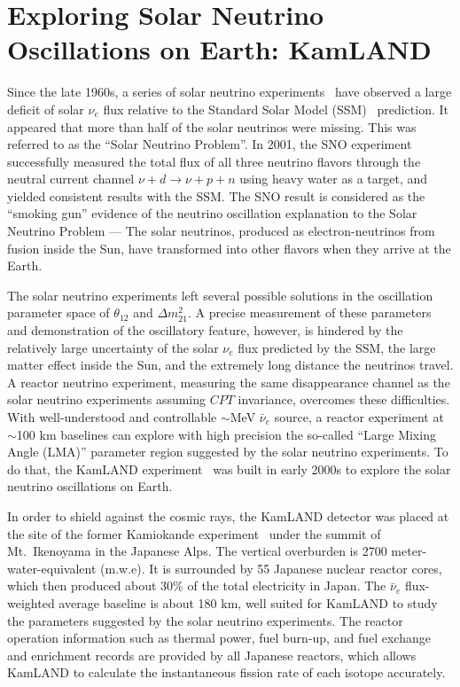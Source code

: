 \section{Exploring Solar Neutrino Oscillations on Earth: KamLAND} 
\label{sec:kamland}

Since the late 1960s, a series of solar neutrino experiments~\cite{Homestake,GALLEX,SAGE,Kamiokande,Super-Kamiokande} have observed a large deficit of solar $\nu_e$ flux relative to the Standard Solar Model (SSM)~\cite{Bahcall} prediction. 
It appeared that more than half of the solar neutrinos were missing. 
This was referred to as the ``Solar Neutrino Problem''. 
In 2001, the SNO experiment~\cite{SNO} successfully measured the total flux of all three neutrino flavors through the neutral current channel $\nu + d \to \nu + p + n$ using heavy water as a target, and yielded consistent results with the SSM. 
The SNO result is considered as the ``smoking gun'' evidence of the neutrino oscillation explanation to the Solar Neutrino Problem --- The solar neutrinos, produced as electron-neutrinos from fusion inside the Sun, have transformed into other flavors when they arrive at the Earth.

The solar neutrino experiments left several possible solutions in the oscillation parameter space of $\theta_{12}$ and $\Delta m^2_{21}$. 
A precise measurement of these parameters and demonstration of the oscillatory feature, however, is hindered by the relatively large uncertainty of the solar $\nu_{e}$ flux predicted by the SSM, the large matter effect inside the Sun, and the extremely long distance the neutrinos travel. 
A reactor neutrino experiment, measuring the same disappearance channel as the solar neutrino experiments assuming $CPT$ invariance, overcomes these difficulties. 
With well-understood and controllable $\sim$MeV $\bar\nu_e$ source, a reactor experiment at $\sim$100 km baselines can explore with high precision the so-called ``Large Mixing Angle (LMA)'' parameter region suggested by the solar neutrino experiments. To do that, the KamLAND experiment~\cite{Kamland03} was built in early 2000s to explore the solar neutrino oscillations on Earth.

In order to shield against the cosmic rays, the KamLAND detector was placed at the site of the former Kamiokande experiment~\cite{Kamiokande} under the summit of Mt.~Ikenoyama in the Japanese Alps. 
The vertical overburden is 2700 meter-water-equivalent (m.w.e). 
It is surrounded by 55 Japanese nuclear reactor cores, which then produced about 30\% of the total electricity in Japan. 
The $\bar\nu_e$ flux-weighted average baseline is about 180 km, well suited for KamLAND to study the parameters suggested by the solar neutrino experiments. 
The reactor operation information such as thermal power, fuel burn-up, and fuel exchange and enrichment records are provided by all Japanese reactors, which allows KamLAND to calculate the instantaneous fission rate of each isotope accurately. 

